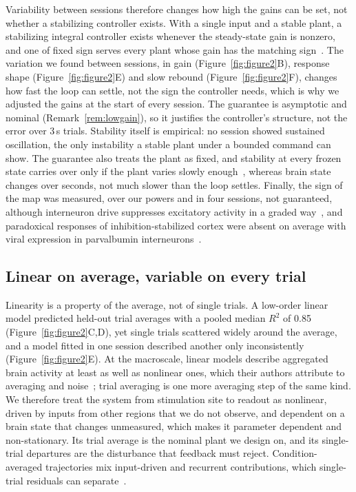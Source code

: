 Variability between sessions therefore changes how high the gains can be set, not whether a stabilizing controller exists. With a single input and a stable plant, a stabilizing integral controller exists whenever the steady-state gain is nonzero, and one of fixed sign serves every plant whose gain has the matching sign~\citep{morari1985robust}. The variation we found between sessions, in gain (Figure~\ref{fig:figure2}B), response shape (Figure~\ref{fig:figure2}E) and slow rebound (Figure~\ref{fig:figure2}F), changes how fast the loop can settle, not the sign the controller needs, which is why we adjusted the gains at the start of every session. The guarantee is asymptotic and nominal (Remark~\ref{rem:lowgain}), so it justifies the controller's structure, not the error over 3\,s trials. Stability itself is empirical: no session showed sustained oscillation, the only instability a stable plant under a bounded command can show. The guarantee also treats the plant as fixed, and stability at every frozen state carries over only if the plant varies slowly enough~\citep{desoer1969slowly}, whereas brain state changes over seconds, not much slower than the loop settles. Finally, the sign of the map was measured, over our powers and in four sessions, not guaranteed, although interneuron drive suppresses excitatory activity in a graded way~\citep{li2019spatiotemporal}, and paradoxical responses of inhibition-stabilized cortex were absent on average with viral expression in parvalbumin interneurons~\citep{sanzeni2020inhibition}.

\subsection*{Linear on average, variable on every trial}

Linearity is a property of the average, not of single trials. A low-order linear model predicted held-out trial averages with a pooled median $R^2$ of 0.85 (Figure~\ref{fig:figure2}C,D), yet single trials scattered widely around the average, and a model fitted in one session described another only inconsistently (Figure~\ref{fig:figure2}E). At the macroscale, linear models describe aggregated brain activity at least as well as nonlinear ones, which their authors attribute to averaging and noise~\citep{Nozari2024}; trial averaging is one more averaging step of the same kind. We therefore treat the system from stimulation site to readout as nonlinear, driven by inputs from other regions that we do not observe, and dependent on a brain state that changes unmeasured, which makes it parameter dependent and non-stationary. Its trial average is the nominal plant we design on, and its single-trial departures are the disturbance that feedback must reject. Condition-averaged trajectories mix input-driven and recurrent contributions, which single-trial residuals can separate~\citep{galgali2023residual}.

